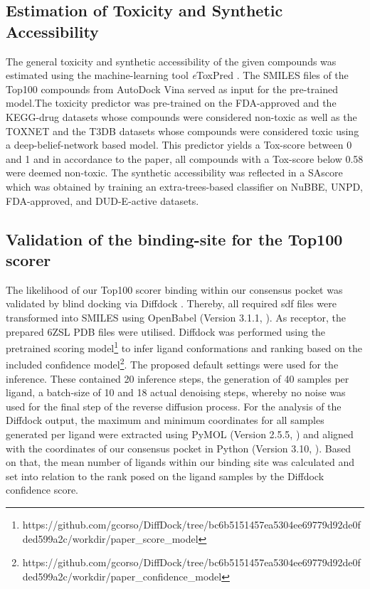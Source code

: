 \documentclass[11pt, letterpaper, titlepage]{article}
\renewcommand{\cite}{\parencite}
\begin{document}
\subsection{Estimation of Toxicity and Synthetic Accessibility}
The general toxicity and synthetic accessibility of the given compounds was estimated using the machine-learning tool \textit{e}ToxPred \cite{pu2019toxpred}. The SMILES files of the Top100 compounds from AutoDock Vina \cite{Trott.2010} served as input for the pre-trained model.The toxicity predictor was pre-trained on the FDA-approved and the KEGG-drug datasets whose compounds were considered non-toxic as well as the TOXNET and the T3DB datasets whose compounds were considered toxic using a deep-belief-network based model. This predictor yields a Tox-score between 0 and 1 and in accordance to the paper, all compounds with a Tox-score below 0.58 were deemed non-toxic. The synthetic accessibility was reflected in a \ac{SAscore} which was obtained by training an extra-trees-based classifier on NuBBE, UNPD, FDA-approved, and DUD-E-active datasets.
 
\subsection{Validation of the binding-site for the Top100 scorer}
The likelihood of our Top100 scorer binding within our consensus pocket was validated by blind docking via Diffdock \cite{Corso.2022}. Thereby, all required sdf files were transformed into SMILES using OpenBabel (Version 3.1.1, \textcite{OpenBabel}). As receptor, the prepared 6ZSL PDB files were utilised. Diffdock was performed using the pretrained scoring model\footnote{https://github.com/gcorso/DiffDock/tree/bc6b5151457ea5304ee69779d92de0fded599a2c/workdir/paper\_score\_model} to infer ligand conformations and ranking based on the included confidence model\footnote{https://github.com/gcorso/DiffDock/tree/bc6b5151457ea5304ee69779d92de0fded599a2c/workdir/paper\_confidence\_model}. The proposed default settings were used for the inference. These contained 20 inference steps, the generation of 40 samples per ligand, a batch-size of 10 and 18 actual denoising steps, whereby no noise was used for the final step of the reverse diffusion process. For the analysis of the Diffdock output, the maximum and minimum coordinates for all samples generated per ligand were extracted using PyMOL (Version 2.5.5, \textcite{PyMOL}) and aligned with the coordinates of our consensus pocket in Python (Version 3.10, \textcite{Python}). Based on that, the mean number of ligands within our binding site was calculated and set into relation to the rank posed on the ligand samples by the Diffdock confidence score.
\end{document}
